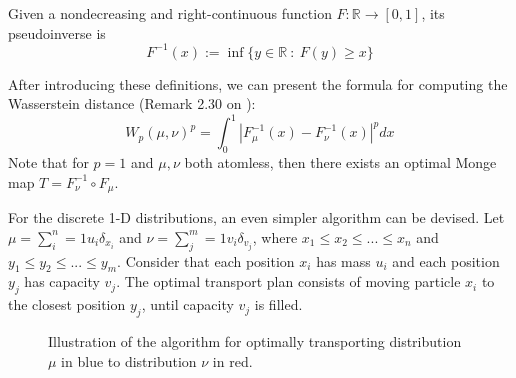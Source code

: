 \begin{definition}
  Given a nondecreasing and right-continuous function $F:\mathbb R \to [0,1]$,
  its pseudoinverse is
  \begin{equation}
    F^{-1}(x):= \inf\{
    y \in \mathbb R \ : \ F(y) \geq x
    \}
  \end{equation}
  \label{def:pseudoinverse}
\end{definition}
After introducing these definitions, we can present the formula for computing the Wasserstein
distance (Remark 2.30 on \citet{peyre2019computational}):
\begin{equation}
  W_p(\mu,\nu)^p = \int_0^1| F_\mu^{-1}(x)- F_\nu^{-1}(x) |^p dx
\end{equation}
Note that for $p=1$ and $\mu,\nu$ both atomless, then
there exists an optimal Monge map $T = F_\nu^{-1} \circ F_\mu$.

For the discrete 1-D distributions, an even simpler algorithm can be devised. Let
$\mu = \sum^n_i=1 u_i \delta_{x_i}$ and
$\nu = \sum^m_j=1 v_i \delta_{v_j}$, where
$x_1\leq x_2 \leq ... \leq x_n$ and
$y_1\leq y_2 \leq ... \leq y_m$. Consider that each position $x_i$ has mass $u_i$
and each position $y_j$ has capacity $v_j$. The optimal transport plan
consists of moving particle $x_i$
to the closest position $y_j$, until capacity $v_j$ is filled.

\begin{figure}[H]
  \centering
  \def\svgscale{0.6}
  
  \caption{Illustration of the algorithm for optimally transporting distribution $\mu$ in blue
  to distribution $\nu$ in red.}
  \label{fig:ot-1d-discrete}
\end{figure}


